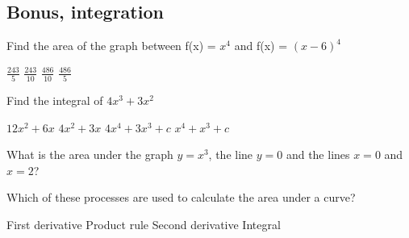 \documentclass{exam}
\begin{document}
\begin{questions}
\section{Bonus, integration}
	\question Find the area of the graph between f(x) = $x^4$ and f(x) = $(x-6)^4$

	\begin{choices}
		\choice $\frac{243}{5}$
		\choice $\frac{243}{10}$
		\choice $\frac{486}{10}$
		\CorrectChoice $\frac{486}{5}$
	\end{choices}
	\question Find the integral of $ 4x^3+3x^2 $

	\begin{choices}
		\choice $12x^2 + 6x$
		\choice $4x^2 + 3x$
		\choice $4x^4 + 3x^3 + c$
		\CorrectChoice $x^4 + x^3 +c$
	\end{choices}
	\question What is the area under the graph $y = x^3$, the line $y = 0$ and the lines $x=0$ and $x=2$?

	\begin{choices}
		\choice 8
		\choice 16
		\choice 24
		\CorrectChoice 4
	\end{choices}
	\question Which of these processes are used to calculate the area under a curve?
	\begin{choices}
		\choice First derivative
		\choice Product rule
		\choice Second derivative
		\CorrectChoice Integral
	\end{choices}




\end{questions}
\end{document}
